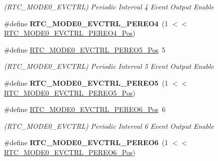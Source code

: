 \begin{DoxyCompactItemize}
\begin{DoxyCompactList}\small\item\em (R\+T\+C\+\_\+\+M\+O\+D\+E0\+\_\+\+E\+V\+C\+T\+R\+L) Periodic Interval 4 Event Output Enable \end{DoxyCompactList}\item 
\hypertarget{group___s_a_m_l21___r_t_c_gaefeb8a71ef08e4f4f3cde054760a3f03}{}\#define {\bfseries R\+T\+C\+\_\+\+M\+O\+D\+E0\+\_\+\+E\+V\+C\+T\+R\+L\+\_\+\+P\+E\+R\+E\+O4}~(1 $<$$<$ \hyperlink{group___s_a_m_l21___r_t_c_ga56f5c240f7e4c95faef7928cb1242092}{R\+T\+C\+\_\+\+M\+O\+D\+E0\+\_\+\+E\+V\+C\+T\+R\+L\+\_\+\+P\+E\+R\+E\+O4\+\_\+\+Pos})\label{group___s_a_m_l21___r_t_c_gaefeb8a71ef08e4f4f3cde054760a3f03}

\item 
\hypertarget{group___s_a_m_l21___r_t_c_ga3d9834fcc2dcf5faeb40ced0789c0281}{}\#define \hyperlink{group___s_a_m_l21___r_t_c_ga3d9834fcc2dcf5faeb40ced0789c0281}{R\+T\+C\+\_\+\+M\+O\+D\+E0\+\_\+\+E\+V\+C\+T\+R\+L\+\_\+\+P\+E\+R\+E\+O5\+\_\+\+Pos}~5\label{group___s_a_m_l21___r_t_c_ga3d9834fcc2dcf5faeb40ced0789c0281}

\begin{DoxyCompactList}\small\item\em (R\+T\+C\+\_\+\+M\+O\+D\+E0\+\_\+\+E\+V\+C\+T\+R\+L) Periodic Interval 5 Event Output Enable \end{DoxyCompactList}\item 
\hypertarget{group___s_a_m_l21___r_t_c_ga7fda14597bc831e701276eed9583ee82}{}\#define {\bfseries R\+T\+C\+\_\+\+M\+O\+D\+E0\+\_\+\+E\+V\+C\+T\+R\+L\+\_\+\+P\+E\+R\+E\+O5}~(1 $<$$<$ \hyperlink{group___s_a_m_l21___r_t_c_ga3d9834fcc2dcf5faeb40ced0789c0281}{R\+T\+C\+\_\+\+M\+O\+D\+E0\+\_\+\+E\+V\+C\+T\+R\+L\+\_\+\+P\+E\+R\+E\+O5\+\_\+\+Pos})\label{group___s_a_m_l21___r_t_c_ga7fda14597bc831e701276eed9583ee82}

\item 
\hypertarget{group___s_a_m_l21___r_t_c_ga0bb8b8cf74711186e1993908a53154d3}{}\#define \hyperlink{group___s_a_m_l21___r_t_c_ga0bb8b8cf74711186e1993908a53154d3}{R\+T\+C\+\_\+\+M\+O\+D\+E0\+\_\+\+E\+V\+C\+T\+R\+L\+\_\+\+P\+E\+R\+E\+O6\+\_\+\+Pos}~6\label{group___s_a_m_l21___r_t_c_ga0bb8b8cf74711186e1993908a53154d3}

\begin{DoxyCompactList}\small\item\em (R\+T\+C\+\_\+\+M\+O\+D\+E0\+\_\+\+E\+V\+C\+T\+R\+L) Periodic Interval 6 Event Output Enable \end{DoxyCompactList}\item 
\hypertarget{group___s_a_m_l21___r_t_c_ga5782349575e0ac0f0c1a2888f437a207}{}\#define {\bfseries R\+T\+C\+\_\+\+M\+O\+D\+E0\+\_\+\+E\+V\+C\+T\+R\+L\+\_\+\+P\+E\+R\+E\+O6}~(1 $<$$<$ \hyperlink{group___s_a_m_l21___r_t_c_ga0bb8b8cf74711186e1993908a53154d3}{R\+T\+C\+\_\+\+M\+O\+D\+E0\+\_\+\+E\+V\+C\+T\+R\+L\+\_\+\+P\+E\+R\+E\+O6\+\_\+\+Pos})\label{group___s_a_m_l21___r_t_c_ga5782349575e0ac0f0c1a2888f437a207}


\end{DoxyCompactItemize}
